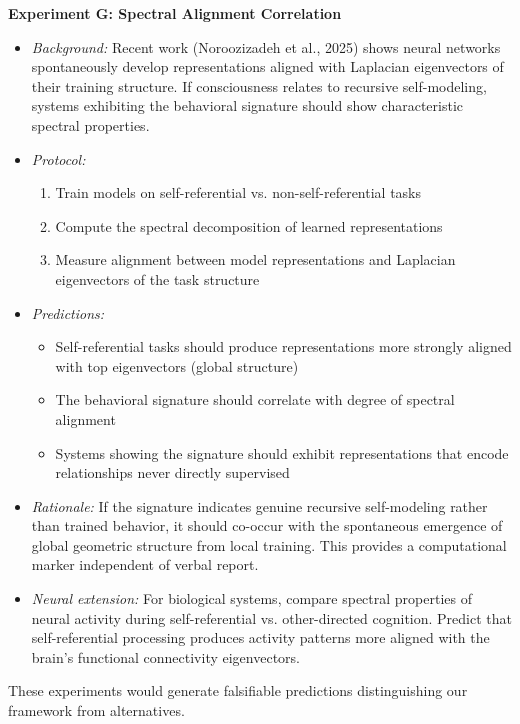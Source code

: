 \documentclass[12pt,a4paper]{article}
\begin{document}
\textbf{Experiment G: Spectral Alignment Correlation}
\begin{itemize}
    \item \textit{Background:} Recent work (Noroozizadeh et al., 2025) shows neural networks spontaneously develop representations aligned with Laplacian eigenvectors of their training structure. If consciousness relates to recursive self-modeling, systems exhibiting the behavioral signature should show characteristic spectral properties.
    \item \textit{Protocol:}
    \begin{enumerate}
        \item Train models on self-referential vs. non-self-referential tasks
        \item Compute the spectral decomposition of learned representations
        \item Measure alignment between model representations and Laplacian eigenvectors of the task structure
    \end{enumerate}
    \item \textit{Predictions:}
    \begin{itemize}
        \item Self-referential tasks should produce representations more strongly aligned with top eigenvectors (global structure)
        \item The behavioral signature should correlate with degree of spectral alignment
        \item Systems showing the signature should exhibit representations that encode relationships never directly supervised
    \end{itemize}
    \item \textit{Rationale:} If the signature indicates genuine recursive self-modeling rather than trained behavior, it should co-occur with the spontaneous emergence of global geometric structure from local training. This provides a computational marker independent of verbal report.
    \item \textit{Neural extension:} For biological systems, compare spectral properties of neural activity during self-referential vs. other-directed cognition. Predict that self-referential processing produces activity patterns more aligned with the brain's functional connectivity eigenvectors.
\end{itemize}

These experiments would generate falsifiable predictions distinguishing our framework from alternatives.
\end{document}
